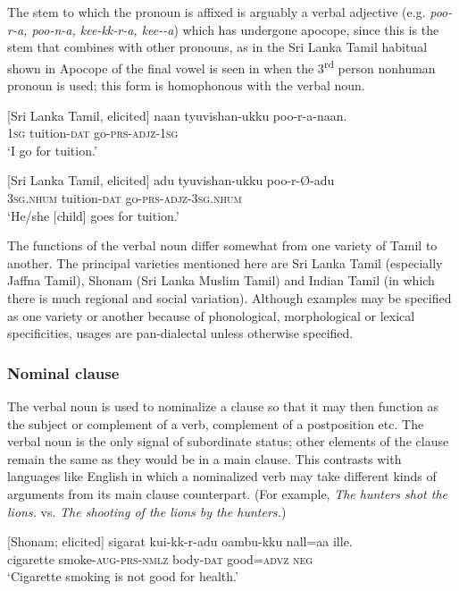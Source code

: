 The stem to which the pronoun is affixed is arguably a verbal adjective (e.g. \textit{poo-r-a, poo-n-a, kee-kk-r-a, kee-{\textrtailt}{\textrtailt}-a}) which has undergone apocope, since this is the stem that combines with other pronouns, as in the Sri Lanka Tamil habitual shown in  Apocope of the final vowel is seen in  when the 3\textsuperscript{rd} person nonhuman pronoun is used; this form is homophonous with the verbal noun.

\ea\label{smith:ex:6} 
{}[Sri Lanka Tamil, elicited]
\gll naan tyuvishan-ukku poo-r-a-naan.\\
1\textsc{sg} tuition-\textsc{dat} go-\textsc{prs}-\textsc{adjz}-1\textsc{sg}\\
`I go for tuition.'
\z

\ea\label{smith:ex:7} 
{}[Sri Lanka Tamil, elicited]
\gll adu tyuvishan-ukku poo-r-{\O}-adu\\
3\textsc{sg}.\textsc{nhum} tuition-\textsc{dat} go-\textsc{prs}-\textsc{adjz}-3\textsc{sg}.\textsc{nhum}\\
`He/she [child] goes for tuition.'
\z

The functions of the verbal noun differ somewhat from one variety of Tamil to another. The principal varieties mentioned here are Sri Lanka Tamil (especially Jaffna Tamil), Shonam (Sri Lanka Muslim Tamil) and Indian Tamil (in which there is much regional and social variation). Although examples may be specified as one variety or another because of phonological, morphological or lexical specificities, usages are pan-dialectal unless otherwise specified.

\subsubsection{Nominal clause }%
The verbal noun is used to nominalize a clause so that it may then function as the subject or complement of a verb, complement of a postposition etc. The verbal noun is the only signal of subordinate status; other elements of the clause remain the same as they would be in a main clause. This contrasts with languages like English in which a nominalized verb may take different kinds of arguments from its main clause counterpart. (For example, \textit{The hunters shot the lions.} vs. \textit{The shooting of the lions by the hunters.}) 

\ea\label{smith:ex:8}
{}[Shonam; elicited]
\gll sigarat ku{\textrtaild}i-kk-r-adu o{\textrtaild}ambu-kku nall=aa ille. \\
cigarette smoke-\textsc{aug}-\textsc{prs}-\textsc{nmlz} body-\textsc{dat} good=\textsc{advz} \textsc{neg}\\
`Cigarette smoking is not good for health.'
\z


